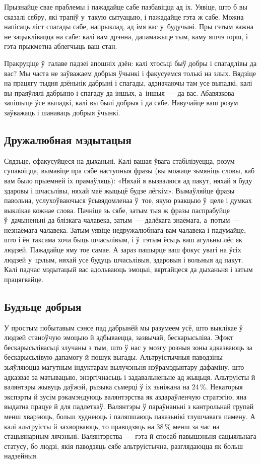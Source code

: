 Прызнайце свае праблемы і пажадайце сабе пазбавіцца ад іх. Уявіце, што б вы сказалі сябру, які трапіў у~такую сытуацыю, і пажадайце гэта ж сабе. Можна напісаць ліст спагады сабе, напрыклад, ад імя вас у~будучыні. Пры гэтым важна не зацыклівацца на сабе: калі вам дрэнна, дапамажыце тым, каму яшчэ горш, і гэта прыкметна аблегчыць ваш стан.

Пракруціце ў~галаве падзеі апошніх дзён: калі хтосьці быў добры і спагадлівы да вас? Мы часта не заўважаем добрыя ўчынкі і факусуемся толькі на злых. Вядзіце на працягу тыдня дзёньнік дабрыні і спагады, адзначаючы там усе выпадкі, калі вы праяўлялі дабрыню і спагаду да іншых, а~іншыя~--- да вас. Абавязкова запішыце ўсе выпадкі, калі вы былі добрыя і да сябе. Навучайце ваш розум заўважаць і шанаваць добрыя ўчынкі.

\subsection*{Дружалюбная мэдытацыя}

Сядзьце, сфакусуйцеся на дыханьні. Калі вашая ўвага стабілізуецца, розум супакоіцца, вымавіце пра сябе наступныя фразы (вы можаце зьмяніць словы, каб вам было прыемней іх прамаўляць): «Няхай я вызвалюся ад пакут, няхай я буду здаровы і шчасьлівы, няхай маё жыцьцё будзе лёгкім». Вымаўляйце фразы павольна, услухоўваючыся ўсьвядомленаа ў~тое, якую рэакцыю ў~целе і думках выклікае кожнае слова. Пачніце зь сябе, затым тыя ж фразы паспрабуйце ў~дачыненьні да блізкага чалавека, затым~--- далёкага знаёмага, а~потым~--- незнаёмага чалавека. Затым уявіце недружалюбнага вам чалавека і падумайце, што і ён таксама хоча быць шчасьлівым, і ў~гэтым ёсьць ваш агульны лёс як людзей. Пажадайце яму тое самае. А зараз пашырце ваш фокус увагі на ўсіх людзей у~цэлым, няхай усе будуць шчасьлівыя, здаровыя і вольныя ад пакут. Калі падчас мэдытацый вас адольваюць эмоцыі, вяртайцеся да дыханьня і затым працягвайце.

\subsection*{Будзьце добрыя}

У простым побытавым сэнсе пад дабрынёй мы разумеем усё, што выклікае ў людзей станоўчую эмоцыю й адбываецца, зазвычай, бескарысьліва. Эфэкт бескарысьлівасьці злучаны з тым, што ў нас у мозгу розныя зоны адказваюць за бескарысьлівую дапамогу й пошук выгады. Альтруістычныя паводзіны зьяўляюцца магутным індуктарам вылучэньня нэўрамэдыятару дафаміну, што адказвае за матывацыю, энэргічнасьць і задавальненьне ад жыцьця. Альтруісты й валянтэры жывуць даўжэй, рызыка сьмерці ў іх зьніжана на 24\,\%. Некаторыя экспэрты й зусім рэкамэндуюць валянтэрства як аздараўленчую стратэгію, яна выдатна працуе й для падлеткаў. Валянтэры ў параўнаньні з кантрольнай групай менш хварэюць, больш худнеюць і паляпшаюць паказьнікі тлушчавага памену. А калі альтруісты й захворваюць, то праводзяць на 38\,\% менш за час на стацыянарным лячэньні. Валянтэрства~--- гэта й спосаб павышэньня сацыяльнага статусу, бо людзі, якія паводзяць сябе альтруістычна, разглядаюцца як больш надзейныя.

